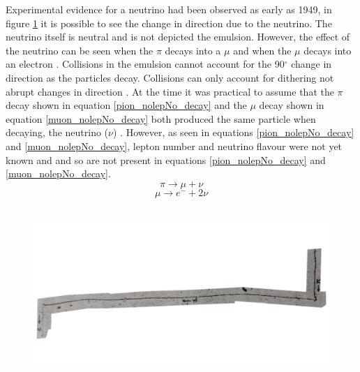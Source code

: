 Experimental evidence for a neutrino had been observed as early as 1949, in figure \ref{pion_path} it is possible to see the change in direction due to the neutrino. The neutrino itself is neutral and is not depicted the emulsion. However, the effect of the neutrino can be seen when the $\pi$ decays into a $\mu$ and when the $\mu$ decays into an electron \cite{griffiths2008book} \cite{griffiths2008neutrino1.5}. Collisions in the emulsion cannot account for the 90$^\circ$ change in direction as the particles decay. Collisions can only account for dithering not abrupt changes in direction \cite{griffiths2008book} \cite{griffiths2008neutrino1.5}. At the time it was practical to assume that the $\pi$ decay shown in equation \ref{pion_nolepNo_decay} and the $\mu$ decay shown in equation \ref{muon_nolepNo_decay} both produced the same particle when decaying, the neutrino ($\nu$) \cite{griffiths2008book} \cite{griffiths2008neutrino1.5}. However, as seen in equations \ref{pion_nolepNo_decay} and \ref{muon_nolepNo_decay}, lepton number and neutrino flavour were not yet known and and so are not present in equations \ref{pion_nolepNo_decay} and \ref{muon_nolepNo_decay}.
\begin{equation}
    \pi \rightarrow \mu + \nu
    \label{pion_nolepNo_decay}
\end{equation}
\begin{equation}
    \mu \rightarrow e^- + 2\nu
    \label{muon_nolepNo_decay}
\end{equation}
\\
\begin{figure}[!h]
 \centering
 \includegraphics[width=\linewidth]{Chapter1/Figs/Raster/neutrinoInChamberRotated90.png}
 \label{pion_path}
\end{figure}
